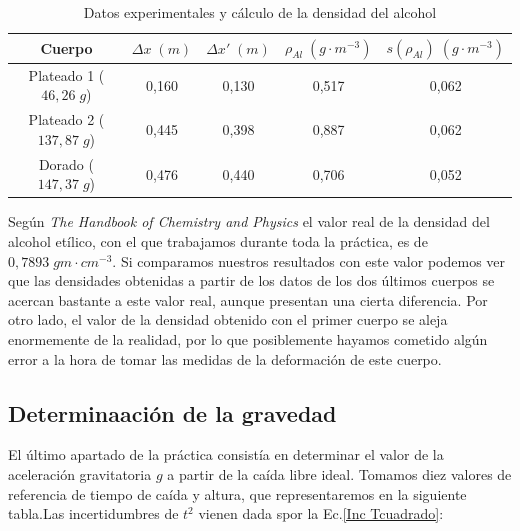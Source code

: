 \documentclass[a4paper,12pt,titlepage]{report}
\begin{document}
\begin{table}[h!]
    \centering
    \begin{tabular}{|c|c|c|c|c|}
    \hline
    Cuerpo &  $\Delta x \; (m)$ & $\Delta x' \; (m)$ & $\rho_{Al} \; (g\cdot m^{-3})$ & $s(\rho_{Al}) \; (g\cdot m^{-3})$\\ \hline
    Plateado 1 ($46,26 \; g$)& 0,160  & 0,130  & 0,517 & 0,062 \\ \hline
    Plateado 2 ($137,87 \; g$)& 0,445 & 0,398 & 0,887 & 0,062 \\ \hline
    Dorado ($147,37 \; g$) & 0,476 & 0,440  & 0,706 & 0,052 \\ \hline
    \end{tabular}
    \caption{Datos experimentales y cálculo de la densidad del alcohol}
    \label{Dens liquido}
    \end{table}

Según \textit{The Handbook of Chemistry and Physics} el valor real de la densidad del alcohol etílico, con el que trabajamos durante toda la práctica, es de $0,7893 \; gm \cdot cm^{-3}$. Si comparamos nuestros resultados con este valor podemos ver que las densidades obtenidas a partir de los datos de los dos últimos cuerpos se acercan bastante a este valor real, aunque presentan una cierta diferencia. Por otro lado, el valor de la densidad obtenido con el primer cuerpo se aleja enormemente de la realidad, por lo que posiblemente hayamos cometido algún error a la hora de tomar las medidas de la deformación de este cuerpo.

\subsection{Determinaación de la gravedad}

El último apartado de la práctica consistía en determinar el valor de la aceleración gravitatoria $g$ a partir de la caída libre ideal. Tomamos diez valores de referencia de tiempo de caída y altura, que representaremos en la siguiente tabla.Las incertidumbres de $t^2$ vienen dada spor la Ec.\ref{Inc Tcuadrado}:
\end{document}
